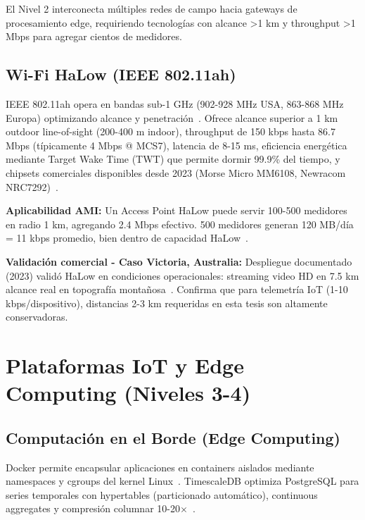 El Nivel 2 interconecta múltiples redes de campo hacia gateways de procesamiento edge, requiriendo tecnologías con alcance >1 km y throughput >1 Mbps para agregar cientos de medidores.

\subsection{Wi-Fi HaLow (IEEE 802.11ah)}

IEEE 802.11ah opera en bandas sub-1 GHz (902-928 MHz USA, 863-868 MHz Europa) optimizando alcance y penetración~\cite{IEEE802.11ah-2016,adameTimeVariantChannelModeling2019}. Ofrece alcance superior a 1 km outdoor line-of-sight (200-400 m indoor), throughput de 150 kbps hasta 86.7 Mbps (típicamente 4 Mbps @ MCS7), latencia de 8-15 ms, eficiencia energética mediante Target Wake Time (TWT) que permite dormir 99.9\% del tiempo, y chipsets comerciales disponibles desde 2023 (Morse Micro MM6108, Newracom NRC7292)~\cite{IEEE802.11ah-2016,khorovSurveyIEEE802112016,morsemicroMM61082024,liEstimatingPropagationCharacteristics2024}.

\textbf{Aplicabilidad AMI:} Un Access Point HaLow puede servir 100-500 medidores en radio 1 km, agregando 2.4 Mbps efectivo. 500 medidores generan 120 MB/día = 11 kbps promedio, bien dentro de capacidad HaLow~\cite{alsafranChallengesImplementingIoT2025}.

\textbf{Validación comercial - Caso Victoria, Australia:} Despliegue documentado (2023) validó HaLow en condiciones operacionales: streaming video HD en 7.5 km alcance real en topografía montañosa~\cite{halownetworkPreventingLivestockTheft2023}. Confirma que para telemetría IoT (1-10 kbps/dispositivo), distancias 2-3 km requeridas en esta tesis son altamente conservadoras.

\section{Plataformas IoT y Edge Computing (Niveles 3-4)}

\subsection{Computación en el Borde (Edge Computing)}

Docker permite encapsular aplicaciones en containers aislados mediante namespaces y cgroups del kernel Linux~\cite{liangReviewEdgeComputing2024}. TimescaleDB optimiza PostgreSQL para series temporales con hypertables (particionado automático), continuous aggregates y compresión columnar 10-20$\times$~\cite{boonmeerukCostEffectiveIIoTGateway2024}.

